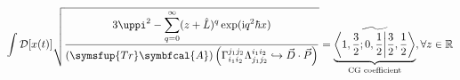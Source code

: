 \documentclass{standalone}
\begin{document}
\Huge
$\displaystyle \int\mathcal{D}[x(t)]\sqrt{\frac{\displaystyle3\uppi^2-\sum_{q=0}^{\infty}(z+\hat L)^{q}\exp(\mathrm{i}q^2 \hbar x)}{\displaystyle (\symsfup{Tr}\symbfcal{A})\left(\Gamma_{i_1i_2}^{j_1j_2}\Lambda_{j_1j_2}^{i_1i_2}\hookrightarrow\vec D\cdot \vec P  \right)}}
=\underbrace{\widetilde{\left\langle1,\frac{3}{2};0,\frac{1}{2}\middle| \frac{3}{2},\frac{1}{2}\right\rangle}}_{\text{CG coefficient}} ,\forall z \in \mathbb{R}$
\end{document}
